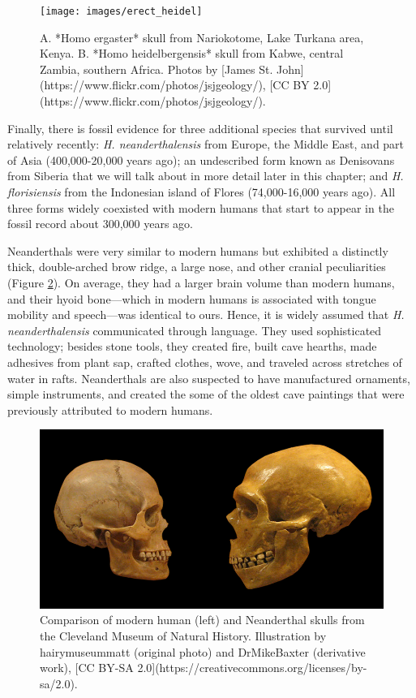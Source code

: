 \documentclass[
]{book}
\begin{document}
\begin{figure}
\texttt{[image: images/erect\_heidel]} \caption{A. *Homo ergaster* skull from Nariokotome, Lake Turkana area, Kenya. B. *Homo heidelbergensis* skull from Kabwe, central Zambia, southern Africa. Photos by [James St. John](https://www.flickr.com/photos/jsjgeology/), [CC BY 2.0](https://www.flickr.com/photos/jsjgeology/).}\label{fig:erectheidel}
\end{figure}

Finally, there is fossil evidence for three additional species that survived until relatively recently: \emph{H. neanderthalensis} from Europe, the Middle East, and part of Asia (400,000-20,000 years ago); an undescribed form known as Denisovans from Siberia that we will talk about in more detail later in this chapter; and \emph{H. florisiensis} from the Indonesian island of Flores (74,000-16,000 years ago). All three forms widely coexisted with modern humans that start to appear in the fossil record about 300,000 years ago.

Neanderthals were very similar to modern humans but exhibited a distinctly thick, double-arched brow ridge, a large nose, and other cranial peculiarities (Figure \ref{fig:sapnea}). On average, they had a larger brain volume than modern humans, and their hyoid bone---which in modern humans is associated with tongue mobility and speech---was identical to ours. Hence, it is widely assumed that \emph{H. neanderthalensis} communicated through language. They used sophisticated technology; besides stone tools, they created fire, built cave hearths, made adhesives from plant sap, crafted clothes, wove, and traveled across stretches of water in rafts. Neanderthals are also suspected to have manufactured ornaments, simple instruments, and created the some of the oldest cave paintings that were previously attributed to modern humans.

\begin{figure}
\includegraphics[width=1\linewidth]{images/sapiens_neanderthals} \caption{Comparison of modern human (left) and Neanderthal skulls from the Cleveland Museum of Natural History. Illustration by hairymuseummatt (original photo) and DrMikeBaxter (derivative work), [CC BY-SA 2.0](https://creativecommons.org/licenses/by-sa/2.0).}\label{fig:sapnea}
\end{figure}
\end{document}
